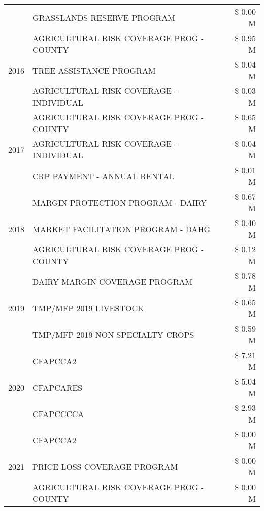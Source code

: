 \begin{tabular}{llr}
 & GRASSLANDS RESERVE PROGRAM & \$ 0.00 M \\
\cline{1-3}
\multirow[t]{3}{*}{2016} & AGRICULTURAL RISK COVERAGE PROG - COUNTY & \$ 0.95 M \\
 & TREE ASSISTANCE PROGRAM & \$ 0.04 M \\
 & AGRICULTURAL RISK COVERAGE - INDIVIDUAL & \$ 0.03 M \\
\cline{1-3}
\multirow[t]{3}{*}{2017} & AGRICULTURAL RISK COVERAGE PROG - COUNTY & \$ 0.65 M \\
 & AGRICULTURAL RISK COVERAGE - INDIVIDUAL & \$ 0.04 M \\
 & CRP PAYMENT - ANNUAL RENTAL & \$ 0.01 M \\
\cline{1-3}
\multirow[t]{3}{*}{2018} & MARGIN PROTECTION PROGRAM - DAIRY & \$ 0.67 M \\
 & MARKET FACILITATION PROGRAM - DAHG & \$ 0.40 M \\
 & AGRICULTURAL RISK COVERAGE PROG - COUNTY & \$ 0.12 M \\
\cline{1-3}
\multirow[t]{3}{*}{2019} & DAIRY MARGIN COVERAGE PROGRAM & \$ 0.78 M \\
 & TMP/MFP 2019 LIVESTOCK & \$ 0.65 M \\
 & TMP/MFP 2019 NON SPECIALTY CROPS & \$ 0.59 M \\
\cline{1-3}
\multirow[t]{3}{*}{2020} & CFAPCCA2 & \$ 7.21 M \\
 & CFAPCARES & \$ 5.04 M \\
 & CFAPCCCCA & \$ 2.93 M \\
\cline{1-3}
\multirow[t]{3}{*}{2021} & CFAPCCA2 & \$ 0.00 M \\
 & PRICE LOSS COVERAGE PROGRAM & \$ 0.00 M \\
 & AGRICULTURAL RISK COVERAGE PROG - COUNTY & \$ 0.00 M \\
\cline{1-3}
\bottomrule
\end{tabular}

